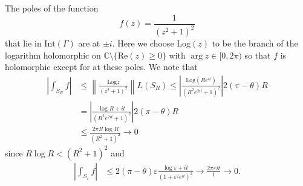 \documentclass{article}
\newcommand\Log{\mathrm{Log}}
\renewcommand\Re{\mathrm{Re}}
\newcommand\dif{\mathop{}\!\mathrm{d}}
\begin{document}
The poles of the function
$$
  f(z)
= \frac{1}{(z^2 + 1)^2}
$$
that lie in $\mathrm{Int}(\Gamma)$ are at $\pm i$. Here we choose
$\Log(z)$ to be the branch of the logarithm holomorphic on
$\mathbb{C} \setminus \{ \Re(z) \geq 0 \}$ with $\arg z \in [0, 2\pi)$
so that $f$ is holomorphic except for at these poles. We note
that
\begin{align*}
      \left|
        \int_{S_R}
          f
      \right|
&\leq \left\|
        \frac{\Log z}
             {(z^2 + 1)^2}
      \right\|
      L(S_R)
 \leq \left|
        \frac{\Log (Re^{it})}
             {(R^2e^{2it} + 1)^2}
      \right|
      2(\pi - \theta)R \\
&=    \left|
        \frac{\log R + it}
             {(R^2e^{2it} + 1)^2}
      \right|
      2(\pi - \theta)R \\
&\leq \frac{2 \pi R \log R}
           {(R^2 + 1)^2}
 \to  0
\end{align*}
since $R \log R < (R^2 + 1)^2$ and
\begin{align*}
      \left|
        \int_{S_\varepsilon}
          f
        \right|
&\leq 2 (\pi - \theta) \varepsilon
      \frac{\log \varepsilon + it}
           {(1 + \varepsilon^2 e^{it})^2}
 \to  \frac{2 \pi \varepsilon i t}
           {1}
 \to  0.
\end{align*}
\end{document}
